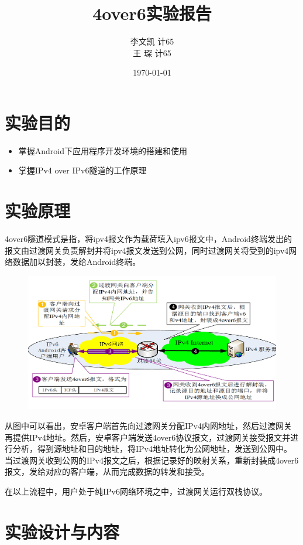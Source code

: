 \documentclass[paper=a4, fontsize=11pt, UTF8]{article} %
\title{\fontsize{18}\baselineskip 4over6实验报告}
\author{李文凯\quad 2016011369 \quad 计65\\王 \; 琛 \quad 2016011360 \quad 计65}
\date{\normalsize\today} %
\begin{document}
\maketitle %

\fontsize{11pt}{18pt}\selectfont

\section{实验目的}

\begin{itemize}
\item 掌握Android下应用程序开发环境的搭建和使用
\item 掌握IPv4 over IPv6隧道的工作原理
\end{itemize}


\section{实验原理}
4over6隧道模式是指，将ipv4报文作为载荷填入ipv6报文中，Android终端发出的报文由过渡网关负责解封并将ipv4报文发送到公网，同时过渡网关将受到的ipv4网络数据加以封装，发给Android终端。
\begin{figure}[H]
    \includegraphics[width=\textwidth]{photos/fig1.png}
\end{figure}
从图中可以看出，安卓客户端首先向过渡网关分配IPv4内网地址，然后过渡网关再提供IPv4地址。然后，安卓客户端发送4over6协议报文，过渡网关接受报文并进行分析，得到源地址和目的地址，将IPv4地址转化为公网地址，发送到公网中。当过渡网关收到公网的IPv4报文之后，根据记录好的映射关系，重新封装成4over6报文，发给对应的客户端，从而完成数据的转发和接受。

在以上流程中，用户处于纯IPv6网络环境之中，过渡网关运行双栈协议。


\section{实验设计与内容}
\end{document}

